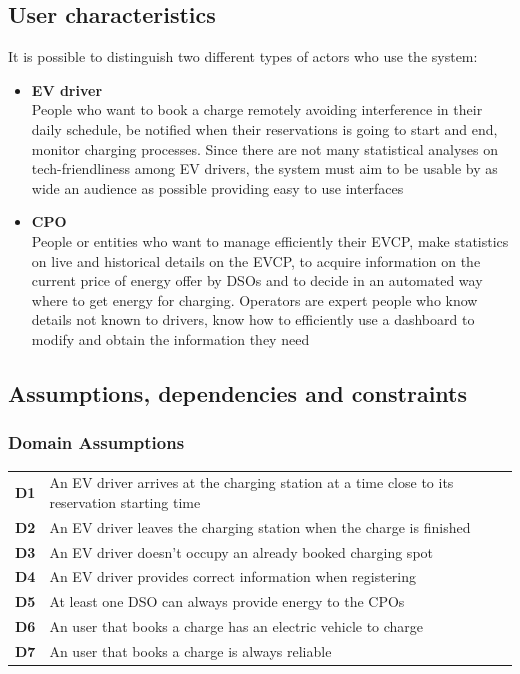 \subsection{User characteristics}
It is possible to distinguish two different types of actors who use the system:
\begin{itemize}
      \item \textbf{EV driver}\\ People who want to book a charge remotely
            avoiding interference in their daily schedule, be notified when their reservations
            is going to start and end, monitor charging processes. Since there are not many statistical analyses on tech-friendliness among EV drivers, the system must aim to be usable by as wide an audience as possible providing easy to use interfaces
      \item \textbf{CPO}\\ People or entities who want to manage efficiently their EVCP, make statistics on live and historical details on the EVCP,
            to acquire information on the current price of energy offer by DSOs and to decide in an automated way
            where to get energy for charging. Operators are expert people who know details not known to drivers, know how to efficiently use a dashboard to modify and obtain the information they need
\end{itemize}


\subsection{Assumptions, dependencies and constraints}
\subsubsection{Domain Assumptions}
\begin{table}[H]
      \begin{tabularx}{\textwidth}{cX}
            \toprule
            \textbf{D1} & An EV driver arrives at the charging station at a time close to its reservation starting time \\
            \textbf{D2} & An EV driver leaves the charging station when the charge is finished                          \\
            \textbf{D3} & An EV driver doesn't occupy an already booked charging spot                                   \\
            \textbf{D4} & An EV driver provides correct information when registering                                    \\
            \textbf{D5} & At least one DSO can always provide energy to the CPOs                                        \\
            \textbf{D6} & An user that books a charge has an electric vehicle to charge                                 \\
            \textbf{D7} & An user that books a charge is always reliable                                                \\
            \bottomrule
      \end{tabularx}
\end{table}

